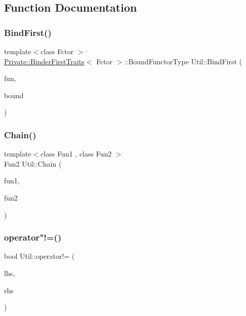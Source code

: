 \subsection{Function Documentation}
\mbox{\label{namespaceUtil_a45c72128892bb56a451a2e5300140d16}} 
\subsubsection{\texorpdfstring{BindFirst()}{BindFirst()}}
{\footnotesize\ttfamily template$<$class Fctor $>$ \\
\mbox{\hyperlink{structUtil_1_1Private_1_1BinderFirstTraits}{Private\+::\+Binder\+First\+Traits}}$<$ Fctor $>$\+::Bound\+Functor\+Type Util\+::\+Bind\+First (\begin{DoxyParamCaption}\item[{const Fctor \&}]{fun,  }\item[{typename Fctor\+::\+Parm1}]{bound }\end{DoxyParamCaption})}

\mbox{\label{namespaceUtil_aec917a0595af831ead52c7ebaba3b708}} 
\subsubsection{\texorpdfstring{Chain()}{Chain()}}
{\footnotesize\ttfamily template$<$class Fun1 , class Fun2 $>$ \\
Fun2 Util\+::\+Chain (\begin{DoxyParamCaption}\item[{const Fun1 \&}]{fun1,  }\item[{const Fun2 \&}]{fun2 }\end{DoxyParamCaption})}

\mbox{\label{namespaceUtil_a84dc32b571d9f688b794f8b9ba420e56}} 
\subsubsection{\texorpdfstring{operator"!=()}{operator!=()}}
{\footnotesize\ttfamily bool Util\+::operator!= (\begin{DoxyParamCaption}\item[{const \mbox{\hyperlink{classUtil_1_1TypeInfo}{Type\+Info}} \&}]{lhs,  }\item[{const \mbox{\hyperlink{classUtil_1_1TypeInfo}{Type\+Info}} \&}]{rhs }\end{DoxyParamCaption})\hspace{0.3cm}{\ttfamily [inline]}}

